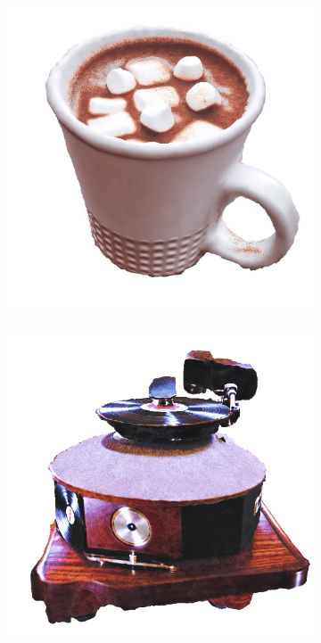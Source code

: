 \begin{figure}[ht]
    \centering
    \small
    \begin{subfigure}[b]{0.3\textwidth}
        \centering
        \includegraphics[width=\textwidth]{figures/appendix/fantasia_a_mug_of_hot_chocolate_with_whipped_cream_and_marshmallows.PNG}
        \caption{}
    \end{subfigure}
    \begin{subfigure}[b]{0.3\textwidth}
        \centering
        \includegraphics[width=\textwidth]{figures/appendix/fantasia_a_vintage_record_player.PNG}

\end{subfigure}
\end{figure}

